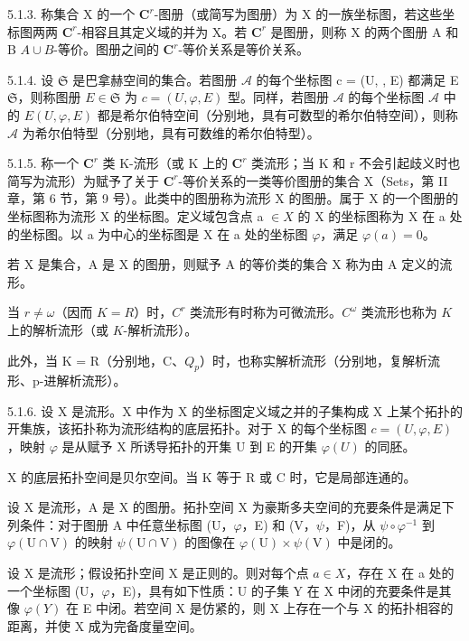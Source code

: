 5.1.3. 称集合 X 的一个 \(\mathbf{C}^{r}\)-图册（或简写为图册）为 X 的一族坐标图，若这些坐标图两两 \(\mathbf{C}^{r}\)-相容且其定义域的并为 X。若 \(\mathbf{C}^{r}\) 是图册，则称 X 的两个图册 A 和 B \(A \cup B\)-等价。图册之间的 \(\mathbf{C}^{r}\)-等价关系是等价关系。

5.1.4. 设 \(\mathfrak{S}\) 是巴拿赫空间的集合。若图册 \(\mathcal{A}\) 的每个坐标图 c = (U, , E) 都满足 E  \(\mathfrak{S}\)，则称图册 \(E \in \mathfrak{S}\) 为 \(c = (U, \varphi, E)\) 型。同样，若图册 \(\mathcal{A}\) 的每个坐标图 \(\mathcal{A}\) 中的 \(E\)\((U, \varphi, E)\) 都是希尔伯特空间（分别地，具有可数型的希尔伯特空间），则称 \(\mathcal{A}\) 为希尔伯特型（分别地，具有可数维的希尔伯特型）。

5.1.5. 称一个 \(\mathbf{C}^{r}\) 类 K-流形（或 K 上的 \(\mathbf{C}^{r}\) 类流形；当 K 和 r 不会引起歧义时也简写为流形）为赋予了关于 \(\mathbf{C}^{r}\)-等价关系的一类等价图册的集合 X（Sets，第 II 章，第 6 节，第 9 号）。此类中的图册称为流形 X 的图册。属于 X 的一个图册的坐标图称为流形 X 的坐标图。定义域包含点 a \(\in X\) 的 X 的坐标图称为 X 在 a 处的坐标图。以 a 为中心的坐标图是 X 在 a 处的坐标图 \(\varphi\)，满足 \(\varphi(a) = 0\)。

若 X 是集合，A 是 X 的图册，则赋予 A 的等价类的集合 X 称为由 A 定义的流形。

当 \(r \neq \omega\)（因而 \(K = R\)）时，\(C^r\) 类流形有时称为可微流形。\(C^\omega\) 类流形也称为 \(K\) 上的解析流形（或 \(K\)-解析流形）。

此外，当 K = R（分别地，C、\(Q_{p}\)）时，也称实解析流形（分别地，复解析流形、p-进解析流形）。

5.1.6. 设 X 是流形。X 中作为 X 的坐标图定义域之并的子集构成 X 上某个拓扑的开集族，该拓扑称为流形结构的底层拓扑。对于 X 的每个坐标图 \(c = (U, \varphi, E)\)，映射 \(\varphi\) 是从赋予 X 所诱导拓扑的开集 U 到 E 的开集 \(\varphi(U)\) 的同胚。

X 的底层拓扑空间是贝尔空间。当 K 等于 R 或 C 时，它是局部连通的。

设 X 是流形，A 是 X 的图册。拓扑空间 X 为豪斯多夫空间的充要条件是满足下列条件：对于图册 A 中任意坐标图 (U，\(\varphi\)，E) 和 (V，\(\psi\)，F)，从 \(\psi \circ \varphi^{-1}\) 到 \(\varphi(\mathrm{U} \cap \mathrm{V})\) 的映射 \(\psi(\mathrm{U} \cap \mathrm{V})\) 的图像在 \(\varphi(\mathrm{U}) \times \psi(\mathrm{V})\) 中是闭的。

设 X 是流形；假设拓扑空间 X 是正则的。则对每个点 \(a \in X\)，存在 X 在 a 处的一个坐标图 (U，\(\varphi\)，E)，具有如下性质：U 的子集 Y 在 X 中闭的充要条件是其像 \(\varphi(Y)\) 在 E 中闭。若空间 X 是仿紧的，则 X 上存在一个与 X 的拓扑相容的距离，并使 X 成为完备度量空间。

